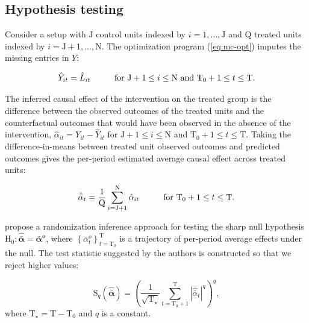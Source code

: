 \documentclass[hidelinks,12pt]{article}
\begin{document}


\subsection{Hypothesis testing} \label{hyp-test}

Consider a setup with $\text{J}$ control units indexed by $i=1, \ldots, \text{J}$ and $\text{Q}$ treated units indexed by $i = \text{J}+1, \ldots, \text{N}$. The optimization program (\ref{eq:mc-opt}) imputes the missing entries in $Y$:

\begin{equation}
\hat{Y}_{it} = \hat{L}_{it} \hspace{10mm} \text{for } \text{J}+1 \leq i \leq \text{N} \text{ and } \text{T}_0+1 \leq t \leq \text{T}.
\end{equation}
\noindent

The inferred causal effect of the intervention on the treated group is the difference between the observed outcomes of the treated units and the counterfactual outcomes that would have been observed in the absence of the intervention, 
$\hat{\alpha}_{it} = Y_{it} - \hat{Y}_{it}$ for $\text{J}+1 \leq i \leq \text{N}$ and $ \text{T}_0+1 \leq t \leq \text{T}.$ Taking the difference-in-means between treated unit observed outcomes and predicted outcomes gives the per-period estimated average causal effect across treated units:

\begin{equation}
\hat{\bar{\alpha}}_{t}  = \frac{1}{\text{Q}} \sum^{\text{N}}_{i=\text{J}+1} \hat{\alpha}_{it} \hspace{10mm}  \text{for } \text{T}_0+1 \leq t \leq \text{T}.  \label{eq:avg-pointwise}
\end{equation}

\citet{chernozhukov2017exact} propose a randomization inference approach for testing the sharp null hypothesis $
\text{H}_0: \boldsymbol{\hat{\bar{\alpha}}} = \boldsymbol{\bar{\alpha}^{o}}$, where $\left\{\bar{\alpha}^{o}_{t}\right\}_{t= \text{T}_0}^\text{T}$ is a trajectory of per-period average effects under the null. The test statistic suggested by the authors is constructed so that we reject higher values:

\begin{equation} \label{tstat}
\text{S}_q (\boldsymbol{\hat{\bar{\alpha}}}) = \left(\frac{1}{\sqrt{\text{T}_\star}} \sum_{t= \text{T}_0 +1}^{\text{T}} |\hat{\bar{\alpha}}_{t}|^q\right)^q,
\end{equation}
%
where $\text{T}_\star = \text{T}- \text{T}_0$ and $q$ is a constant. 
\end{document}
